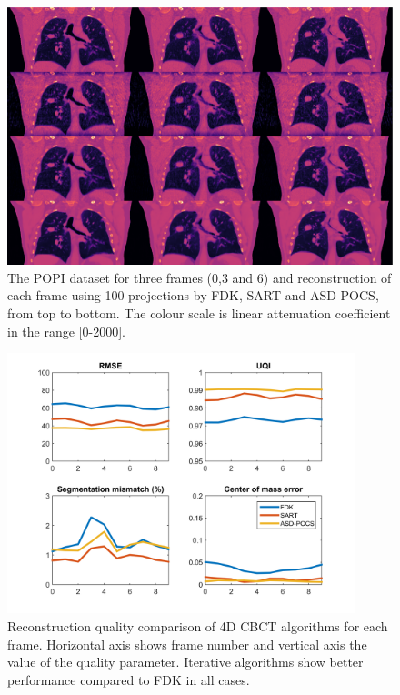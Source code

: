\begin{figure}
\begin{center}

\includegraphics[width=\textwidth]{accuracyMC/4DCBCT3stage.png} 


\end{center}

\caption[Three frames of the 4D CBCT recosntruction with different algorithm]{\label{fig:4dCBCT3static} The POPI dataset for three frames (0,3 and 6) and reconstruction of each frame using 100 projections by FDK, SART and ASD-POCS, from top to bottom.  The colour scale is linear attenuation coefficient in the range [0-2000].} 
\end{figure}

\begin{figure}
\begin{center}

\includegraphics[width=0.9\textwidth]{accuracyMC/4DCBCTparams.png} 


\end{center}

\caption[Reconstruction quality comparison of 4D CBCT algorithms]{\label{fig:4dCBCTquality} Reconstruction quality comparison of 4D CBCT algorithms for each frame. Horizontal axis shows frame number and vertical axis the value of the quality parameter. Iterative algorithms show better performance compared to FDK in all cases.} 
\end{figure}

